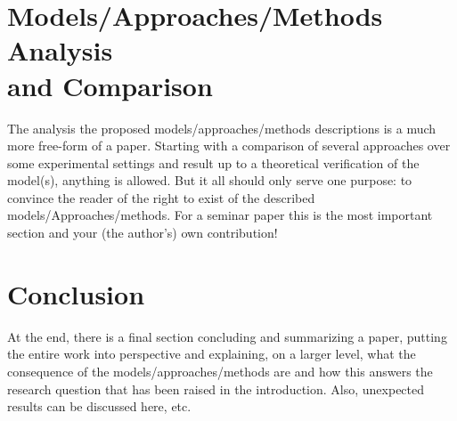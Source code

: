 \documentclass[12pt,twoside]{article}
\theoremstyle{plain}
\theoremstyle{definition}
\theoremstyle{remark}
\begin{document}
\section{Models/Approaches/Methods Analysis \\ and Comparison}
\label{sec:analysis}
The analysis the proposed models/approaches/methods descriptions is a much more free-form of a paper. Starting with a comparison of several approaches over some experimental settings and result up to a theoretical verification of the model(s), anything is allowed. But it all should only serve one purpose: to convince the reader of the right to exist of the described models/Approaches/methods. For a seminar paper this is the most important section and your (the author's) own contribution!

\section{Conclusion}
\label{sec:concl}

At the end, there is a final section concluding and summarizing a paper, putting the entire work into perspective and explaining, on a larger level, what the consequence of the models/approaches/methods are and how this answers the research question that has been raised in the introduction. Also, unexpected results can be discussed here, etc.

%
%
\newpage


\end{document}

